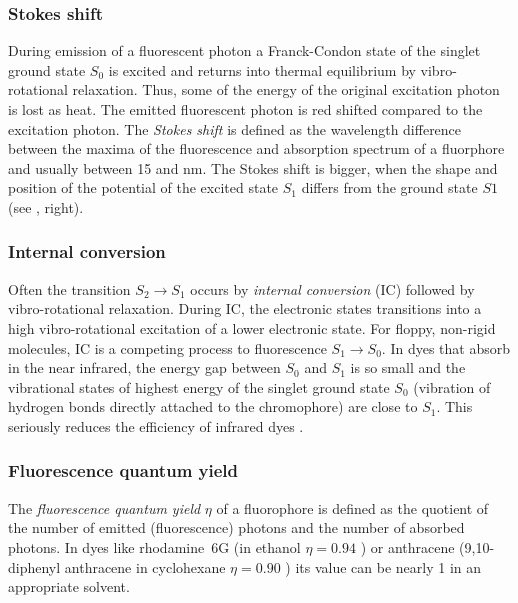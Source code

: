 \subsubsection{Stokes shift}
During emission of a fluorescent photon a Franck-Condon state of the
singlet ground state $S_0$ is excited and returns into thermal
equilibrium by vibro-rotational relaxation. Thus, some of the energy
of the original excitation photon is lost as heat. The emitted
fluorescent photon is red shifted compared to the excitation
photon. The \emph{Stokes shift} is defined as the wavelength
difference between the maxima of the fluorescence and absorption
spectrum of a fluorphore and usually between 15 and \unit[30]{nm}.
The Stokes shift is bigger, when the shape and position of the
potential of the excited state $S_1$ differs from the ground state
$S1$ (see , right).

\subsubsection{Internal conversion}
Often the transition $S_2\rightarrow S_1$ occurs by \emph{internal
  conversion} (IC) followed by vibro-rotational relaxation. During IC,
the electronic states transitions into a high vibro-rotational
excitation of a lower electronic state. For floppy, non-rigid
molecules, IC is a competing process to fluorescence $S_1\rightarrow
S_0$. In dyes that absorb in the near infrared, the energy gap between
$S_0$ and $S_1$ is so small and the vibrational states of highest
energy of the singlet ground state $S_0$ (vibration of hydrogen bonds
directly attached to the chromophore) are close to $S_1$. This
seriously reduces the efficiency of infrared dyes
\citep[p.~43]{Sauer2011}.


\subsubsection{Fluorescence quantum yield}
The \emph{fluorescence quantum yield} $\eta$ of a fluorophore is
defined as the quotient of the number of emitted (fluorescence)
photons and the number of absorbed photons. In dyes like rhodamine~6G
(in ethanol $\eta=0.94$ \cite{Fischer1996}) or anthracene
(9,10-diphenyl anthracene in cyclohexane $\eta=0.90$ \cite{Hamai1983})
its value can be nearly 1 in an appropriate solvent.


